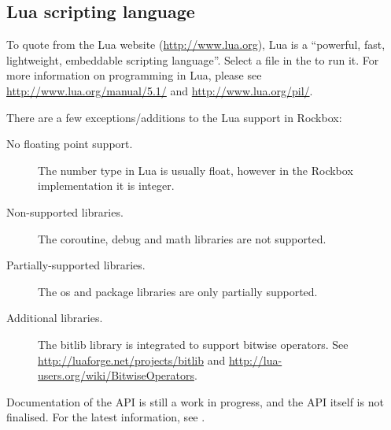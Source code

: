 \subsection{Lua scripting language}

To quote from the Lua website (\url{http://www.lua.org}), Lua is a ``powerful,
fast, lightweight, embeddable scripting language''. Select a  file
in the  to run it. For more information on programming
in Lua, please see \url{http://www.lua.org/manual/5.1/} and
\url{http://www.lua.org/pil/}.

There are a few exceptions/additions to the Lua support in Rockbox:
\begin{description}
    \item[No floating point support.] The number type in Lua is usually float,
    however in the Rockbox implementation it is integer.
    \item[Non-supported libraries.] The coroutine, debug and math libraries are
    not supported.
    \item[Partially-supported libraries.]  The os and package libraries are only
    partially supported.
    \item[Additional libraries.] The bitlib library is integrated to support
    bitwise operators.  See \url{http://luaforge.net/projects/bitlib} and
    \url{http://lua-users.org/wiki/BitwiseOperators}.
\end{description}

Documentation of the API is still a work in progress, and the API itself is
not finalised. For the latest information, see .\\

